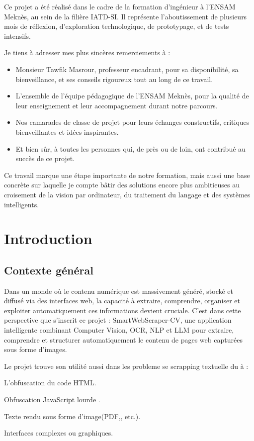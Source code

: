 \documentclass[12pt,a4paper]{report}
\begin{document}
Ce projet a été réalisé dans le cadre de la formation d'ingénieur à l'ENSAM Meknès, au sein de la filière IATD-SI.
Il représente l'aboutissement de plusieurs mois de réflexion, d'exploration technologique, de prototypage, et de tests intensifs.

Je tiens à adresser mes plus sincères remerciements à :
\begin{itemize}
\item Monsieur Tawfik Masrour, professeur encadrant, pour sa disponibilité, sa bienveillance, et ses conseils rigoureux tout au long de ce travail.
\item L'ensemble de l'équipe pédagogique de l'ENSAM Meknès, pour la qualité de leur enseignement et leur accompagnement durant notre parcours.
\item Nos camarades de classe  de projet pour leurs échanges constructifs, critiques bienveillantes et idées inspirantes.
\item Et bien sûr, à toutes les personnes qui, de près ou de loin, ont contribué au succès de ce projet.
\end{itemize}

Ce travail marque une étape importante de notre formation, mais aussi une base concrète sur laquelle je compte bâtir des solutions encore plus ambitieuses au croisement de la vision par ordinateur, du traitement du langage et des systèmes intelligents.

\chapter{ Introduction}

\section{Contexte général}

Dans un monde où le contenu numérique est massivement généré, stocké et diffusé via des interfaces web, la capacité à extraire, comprendre, organiser et exploiter automatiquement ces informations devient cruciale. C'est dans cette perspective que s'inscrit ce projet : SmartWebScraper-CV, une application intelligente combinant Computer Vision, OCR, NLP et LLM pour extraire, comprendre et structurer automatiquement le contenu de pages web capturées sous forme d'images.

Le projet trouve son utilité aussi dans les probleme se scrapping textuelle du à :
\item L'obfuscation du code HTML.
\item Obfuscation JavaScript lourde .
\item Texte rendu sous forme d'image(PDF,, etc.).
\item Interfaces complexes ou graphiques.
\end{document}
